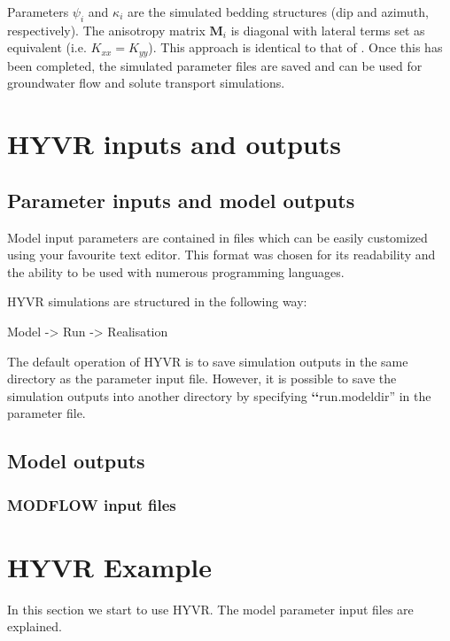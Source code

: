\documentclass[letterpaper,10pt,english]{sphinxmanual}
\begin{document}
Parameters \(\psi_i\) and \(\kappa_i\) are the simulated bedding structures (dip and azimuth, respectively). The anisotropy matrix \(\textbf{M}_i\) is diagonal with lateral terms set as equivalent (i.e. \(K_{xx} = K_{yy}\)). This approach is identical to that of \label{methods:id10}{\hyperref[references:bennett2017]{\sphinxcrossref{{[}BHC17{]}}}}. Once this has been completed, the simulated parameter files are saved and can be used for groundwater flow and solute transport simulations.


\chapter{HYVR inputs and outputs}
\label{inout::doc}\label{inout:hyvr-inputs-and-outputs}

\section{Parameter inputs and model outputs}
\label{inout:parameter-inputs-and-model-outputs}
Model input parameters are contained in  files which can be easily customized using your favourite text editor. This format was chosen for its readability and the ability to be used with numerous programming languages.

HYVR simulations are structured in the following way:

Model -\textgreater{} Run -\textgreater{} Realisation

The default operation of HYVR is to save simulation outputs in the same directory as the  parameter input file. However, it is possible to save the simulation outputs into another directory by specifying {\color{red}\bfseries{}{}`{}`}run.modeldir'' in the parameter file.


\section{Model outputs}
\label{inout:model-outputs}

\subsection{MODFLOW input files}
\label{inout:modflow-input-files}

\chapter{HYVR Example}
\label{example::doc}\label{example:hyvr-example}
In this section we start to use HYVR. The model parameter input files are explained.
\end{document}
